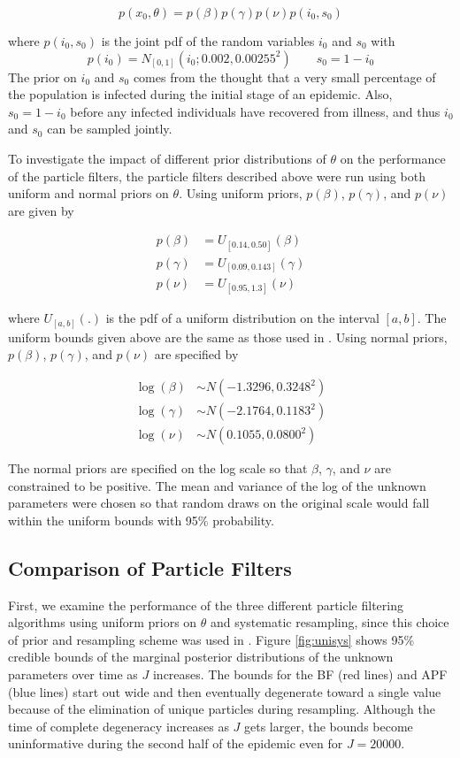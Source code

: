 \documentclass{elsarticle}
\begin{document}
\[p\left(x_0,\theta\right) = p\left(\beta\right)p\left(\gamma\right)p\left(\nu\right)p\left(i_0,s_0\right)\]

\noindent where $p(i_0,s_0)$ is the joint pdf of the random variables $i_0$ and $s_0$ with
\[p\left(i_0\right) = N_{[0,1]}\left(i_0;0.002,0.00255^2\right) \qquad s_0 = 1 - i_0 \]
The prior on $i_0$ and $s_0$ comes from the thought that a very small percentage of the population is infected during the initial stage of an epidemic.  Also, $s_0 = 1 - i_0$ before any infected individuals have recovered from illness, and thus $i_0$ and $s_0$ can be sampled jointly.

To investigate the impact of different prior distributions of $\theta$ on the performance of the particle filters, the particle filters described above were run using both uniform and normal priors on $\theta$.  Using uniform priors, $p(\beta)$, $p(\gamma)$, and $p(\nu)$ are given by

\begin{align*}
p(\beta) &= U_{[0.14, 0.50]}(\beta) \\
p(\gamma) &= U_{[0.09, 0.143]}(\gamma) \\
p(\nu) &= U_{[0.95,1.3]}(\nu)
\end{align*}

\noindent where $U_{[a,b]}(.)$ is the pdf of a uniform distribution on the interval $[a,b]$.  The uniform bounds given above are the same as those used in \citet{skvortsov2012monitoring}.  Using normal priors, $p(\beta)$, $p(\gamma)$, and $p(\nu)$ are specified by

\begin{align*}
\log(\beta) &\sim  N(-1.3296, 0.3248^2) \\
\log(\gamma) &\sim N(-2.1764, 0.1183^2) \\
\log(\nu) &\sim N(0.1055, 0.0800^2)
\end{align*}

\noindent The normal priors are specified on the log scale so that $\beta$, $\gamma$, and $\nu$ are constrained to be positive.  The mean and variance of the log of the unknown parameters were chosen so that random draws on the original scale would fall within the uniform bounds with 95\% probability.

\subsection{Comparison of Particle Filters}

First, we examine the performance of the three different particle filtering algorithms using uniform priors on $\theta$ and systematic resampling, since this choice of prior and resampling scheme was used in \citet{skvortsov2012monitoring}.  Figure \ref{fig:unisys} shows 95\% credible bounds of the marginal posterior distributions of the unknown parameters over time as $J$ increases.  The bounds for the BF (red lines) and APF (blue lines) start out wide and then eventually degenerate toward a single value because of the elimination of unique particles during resampling.  Although the time of complete degeneracy increases as $J$ gets larger, the bounds become uninformative during the second half of the epidemic even for $J = 20000$.
\end{document}
